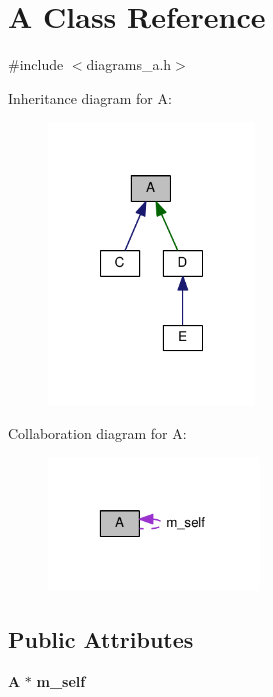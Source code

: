 \section{A Class Reference}
\label{class_a}


{\ttfamily \#include $<$diagrams\-\_\-a.\-h$>$}



Inheritance diagram for A\-:\nopagebreak
\begin{figure}[H]
\begin{center}
\leavevmode
\includegraphics[width=155pt]{class_a__inherit__graph}
\end{center}
\end{figure}


Collaboration diagram for A\-:\nopagebreak
\begin{figure}[H]
\begin{center}
\leavevmode
\includegraphics[width=159pt]{class_a__coll__graph}
\end{center}
\end{figure}
\subsection*{Public Attributes}
\begin{DoxyCompactItemize}
\item 
{\bf A} $\ast$ {\bf m\-\_\-self}
\end{DoxyCompactItemize}


